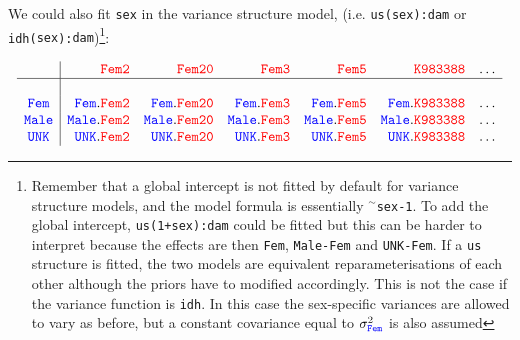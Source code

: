 \documentclass{article}
\begin{document}
We could also fit \texttt{sex} in the variance structure model, (i.e. \texttt{us({\color{blue}sex}):{\color{red}dam}} or \texttt{idh({\color{blue}sex}):{\color{red}dam}})\footnote{Remember that a global intercept is not fitted by default for variance structure models, and the model formula is essentially $^{\sim}$\texttt{sex-1}. To add the global intercept, \texttt{us({\color{blue}1+sex}):{\color{red}dam}} could be fitted but this can be harder to interpret because the effects are then {\color{blue} \texttt{Fem}}, {\color{blue} \texttt{Male-Fem}} and {\color{blue} \texttt{UNK-Fem}}. If a \texttt{us} structure is fitted, the two models are equivalent reparameterisations of each other although the priors have to modified accordingly. This is not the case if the variance function is \texttt{idh}. In this case the sex-specific variances are allowed to vary as before, but a constant covariance equal to $\sigma^{2}_{\color{blue} \texttt{Fem}}$ is also assumed}:

\begin{displaymath}
\begin{array}{c|rrrrrc}
&{\color{red} \texttt{Fem2}}&{\color{red} \texttt{Fem20}}&{\color{red} \texttt{Fem3}}&{\color{red} \texttt{Fem5}}&{\color{red} \texttt{K983388}}&\dots\\
\hline\\
{\color{blue} \texttt{Fem}}&{\color{blue} \texttt{Fem}}.{\color{red} \texttt{Fem2}}&{\color{blue} \texttt{Fem}}.{\color{red} \texttt{Fem20}}&{\color{blue} \texttt{Fem}}.{\color{red} \texttt{Fem3}}&{\color{blue} \texttt{Fem}}.{\color{red} \texttt{Fem5}}&{\color{blue} \texttt{Fem}}.{\color{red} \texttt{K983388}}&\dots\\
{\color{blue} \texttt{Male}}&{\color{blue} \texttt{Male}}.{\color{red} \texttt{Fem2}}&{\color{blue} \texttt{Male}}.{\color{red} \texttt{Fem20}}&{\color{blue} \texttt{Male}}.{\color{red} \texttt{Fem3}}&{\color{blue} \texttt{Male}}.{\color{red} \texttt{Fem5}}&{\color{blue} \texttt{Male}}.{\color{red} \texttt{K983388}}&\dots\\
{\color{blue} \texttt{UNK}}&{\color{blue} \texttt{UNK}}.{\color{red} \texttt{Fem2}}&{\color{blue} \texttt{UNK}}.{\color{red} \texttt{Fem20}}&{\color{blue} \texttt{UNK}}.{\color{red} \texttt{Fem3}}&{\color{blue} \texttt{UNK}}.{\color{red} \texttt{Fem5}}&{\color{blue} \texttt{UNK}}.{\color{red} \texttt{K983388}}&\dots\\
\end{array}
\end{displaymath}
\end{document}
